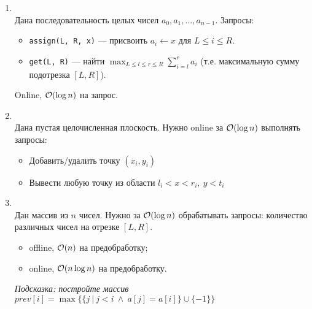 \begin{enumerate}
  \item {}\\
    Дана последовательность целых чисел $a_0, a_1, \dots, a_{n-1}$. Запросы:
    \begin{itemize}
      \item \texttt{assign(L, R, x)} --- присвоить $a_i \leftarrow x$ для $L \le i \le R$.
      \item
        \texttt{get(L, R)} --- найти $\max_{L \le l \le r \le R} \sum_{i=l}^r a_i$
        (т.е. максимальную сумму подотрезка $[L, R]$).
    \end{itemize}
    Online, $\mathcal{O}(\log{n})$ на запрос.

  \item {}\\
    Дана пустая целочисленная плоскость. Нужно online за $\mathcal{O}(\log n)$ выполнять запросы:
    \begin{itemize}
      \item Добавить/удалить точку $(x_i, y_i)$
      \item Вывести любую точку из области $l_i < x < r_i,~ y < t_i$
    \end{itemize}

  \item {}\\
    Дан массив из $n$ чисел. Нужно за $\mathcal{O}(\log n)$ обрабатывать запросы: количество
    различных чисел на отрезке $[L, R]$.
        \begin{itemize}
            \item offline, $\mathcal{O}(n)$ на предобработку;
            \item online, $\mathcal{O}(n \log n)$ на предобработку.
        \end{itemize}
    \emph{Подсказка: постройте массив $prev[i] = \max \Big\lbrace \{ j ~|~ j < i ~\land~ a[j] = a[i] \} \cup \{-1\} \Big\rbrace$}




\end{enumerate}
